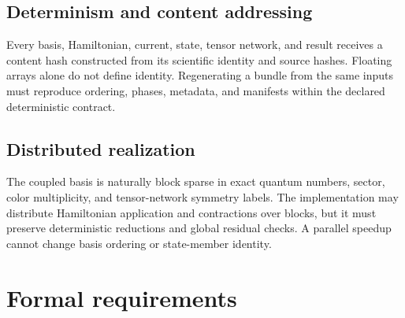 \documentclass[11pt]{article}
\begin{document}
\subsection{Determinism and content addressing}

Every basis, Hamiltonian, current, state, tensor network, and result receives a
content hash constructed from its scientific identity and source hashes.
Floating arrays alone do not define identity.  Regenerating a bundle from the
same inputs must reproduce ordering, phases, metadata, and manifests within the
declared deterministic contract.

\subsection{Distributed realization}

The coupled basis is naturally block sparse in exact quantum numbers, sector,
color multiplicity, and tensor-network symmetry labels.  The implementation
may distribute Hamiltonian application and contractions over blocks, but it
must preserve deterministic reductions and global residual checks.  A
parallel speedup cannot change basis ordering or state-member identity.

\section{Formal requirements}
\end{document}
